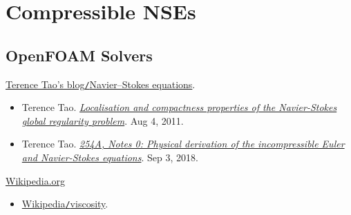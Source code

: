 \documentclass{article}
\numberwithin{equation}{section}
\begin{document}
\section{Compressible NSEs}

\subsection{OpenFOAM Solvers}


\begin{thebibliography}{99}
	 \href{https://terrytao.wordpress.com/tag/navier-stokes-equations/}{Terence Tao's blog\texttt{/}Navier--Stokes equations}.
	\begin{itemize}
		\item Terence Tao. \href{https://terrytao.wordpress.com/2011/08/04/localisation-and-compactness-properties-of-the-navier-stokes-global-regularity-problem}{\textit{Localisation and compactness properties of the Navier-Stokes global regularity problem}}. Aug 4, 2011.
		\item Terence Tao. \href{https://terrytao.wordpress.com/2018/09/03/254a-notes-0-physical-derivation-of-the-incompressible-euler-and-navier-stokes-equations}{\textit{254A, Notes 0: Physical derivation of the incompressible Euler and Navier-Stokes equations}}. Sep 3, 2018.
	\end{itemize}
	
	 \href{https://en.wikipedia.org}{Wikipedia.org}
	\begin{itemize}
		\item \href{https://en.wikipedia.org/wiki/Viscosity}{Wikipedia\texttt{/}viscosity}.
	\end{itemize}
\end{thebibliography}
\printbibliography[heading=bibintoc]
	
\end{document}
